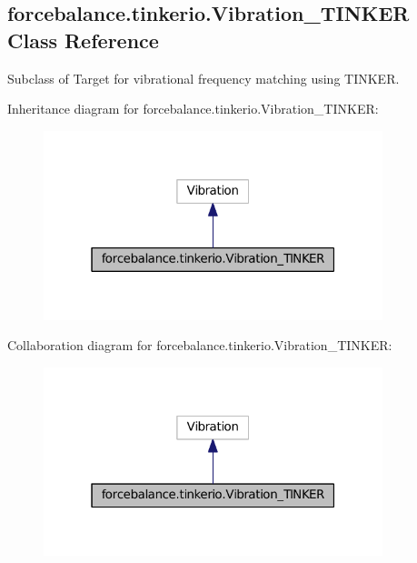 \hypertarget{classforcebalance_1_1tinkerio_1_1Vibration__TINKER}{\subsection{forcebalance.\-tinkerio.\-Vibration\-\_\-\-T\-I\-N\-K\-E\-R \-Class \-Reference}
\label{classforcebalance_1_1tinkerio_1_1Vibration__TINKER}
}


\-Subclass of \-Target for vibrational frequency matching using \-T\-I\-N\-K\-E\-R.  




\-Inheritance diagram for forcebalance.\-tinkerio.\-Vibration\-\_\-\-T\-I\-N\-K\-E\-R\-:\nopagebreak
\begin{figure}[H]
\begin{center}
\leavevmode
\includegraphics[width=280pt]{classforcebalance_1_1tinkerio_1_1Vibration__TINKER__inherit__graph}
\end{center}
\end{figure}


\-Collaboration diagram for forcebalance.\-tinkerio.\-Vibration\-\_\-\-T\-I\-N\-K\-E\-R\-:\nopagebreak
\begin{figure}[H]
\begin{center}
\leavevmode
\includegraphics[width=280pt]{classforcebalance_1_1tinkerio_1_1Vibration__TINKER__coll__graph}
\end{center}
\end{figure}
